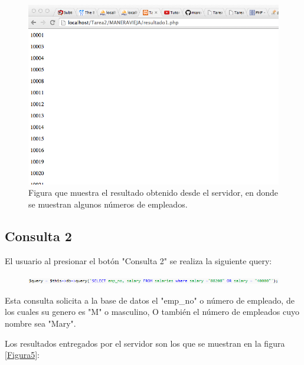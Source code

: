 \begin{figure}[htb]
	\label{Figura3}
	\begin{center}
		\includegraphics[scale=0.3]{imagenes/resultado1.png}
		\caption{Figura que muestra el resultado obtenido desde el servidor, en donde se muestran algunos números de empleados.}
	\end{center}
\end{figure}

\newpage

\subsection{Consulta 2}

El usuario al presionar el botón "Consulta 2" se realiza la siguiente query:

\begin{figure}[htb]
	\label{Figura4}
	\begin{center}
		\includegraphics[scale=0.7]{imagenes/query2.png}
	\end{center}
\end{figure}

Esta consulta solicita a la base de datos el "emp\_no" o número de empleado, de los cuales su genero es "M" o masculino, O también el número de empleados cuyo nombre sea "Mary".

Los resultados entregados por el servidor son los que se muestran en la figura \ref{Figura5}:

